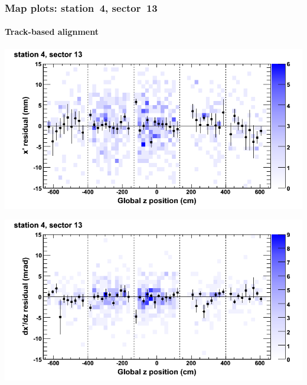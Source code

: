 \documentclass[compress]{beamer}
\begin{document}
\begin{frame}
\frametitle{Map plots: station~4, sector~13}
\framesubtitle{Track-based alignment}
\includegraphics[width=0.5\linewidth]{mapplots_re05/DTvsz_st4sec13_x.png}

\includegraphics[width=0.5\linewidth]{mapplots_re05/DTvsz_st4sec13_dxdz.png}
\end{frame}
\end{document}
